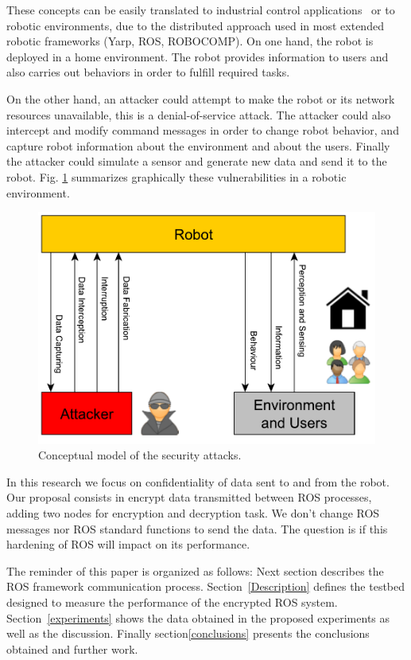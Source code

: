 \documentclass[journal,twoside]{JoPhA}
\begin{document}
These concepts can be easily translated to industrial control applications~\cite{huitsing2008attack} or to robotic environments, due to the distributed approach used in most extended robotic frameworks (Yarp, ROS, ROBOCOMP). On one hand, the robot is deployed in a home environment. The robot provides information to users and also carries out behaviors in order to fulfill required tasks. 

On the other hand, an attacker could attempt to make the robot or its network resources unavailable, this is a denial-of-service attack. The attacker could also intercept and modify command messages in order to change robot behavior, and capture robot information about the environment and about the users. Finally the attacker could simulate a sensor and generate new data and send it to the robot. Fig. \ref{fig:Conceptualmodel} summarizes graphically these vulnerabilities in a robotic environment.

\begin{figure}[ht]
	\centering
	\includegraphics[width=.5\textwidth]{RobotsAttacks.pdf}
	\caption{Conceptual model of the security attacks.}
	\label{fig:Conceptualmodel}
\end{figure}

In this research we focus on confidentiality of data sent to and from the robot. Our proposal consists in encrypt data transmitted between ROS processes, adding two nodes for encryption and decryption task. We don't change ROS messages nor ROS standard functions to send the data. The question is if this hardening of ROS will impact on its performance.



The reminder of this paper is organized as follows: Next section describes the ROS framework communication process. Section~\ref{Description} defines the testbed designed to measure the performance of the encrypted ROS system. Section~\ref{experiments} shows the data obtained in the proposed experiments as well as the discussion. Finally section\ref{conclusions} presents the conclusions obtained and further work.
\end{document}
